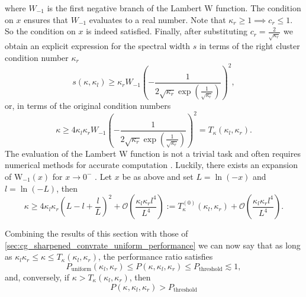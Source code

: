 where $W_{-1}$ is the first negative branch of the Lambert $\mathrm{W}$ function. The condition on $x$ ensures that $W_{-1}$ evaluates to a real number. Note that $\kappa_r\geq1 \implies c_r \leq 1$. So the condition on $x$ is indeed satisfied. Finally, after substituting $c_r = \frac{2}{\sqrt{\kappa_r}}$ we obtain an explicit expression for the spectral width $s$ in terms of the right cluster condition number $\kappa_r$
\[
    s(\kappa, \kappa_l) \geq \kappa_r W_{-1}\left(-\frac{1}{2\sqrt{\kappa_r}\exp\left(\frac{1}{\sqrt{\kappa_r}}\right)}\right)^2,
\]
or, in terms of the original condition numbers
\begin{equation}
    \kappa \geq 4\kappa_l\kappa_r W_{-1}\left(-\frac{1}{2\sqrt{\kappa_r}\exp\left(\frac{1}{\sqrt{\kappa_r}}\right)}\right)^2 = T_{\kappa}(\kappa_l, \kappa_r).
    \label{eq:threshold_inequality_explicit}
\end{equation}
The evaluation of the Lambert $\mathrm{W}$ function is not a trivial task and often requires numerical methods for accurate computation \cite{evaluation_of_the_lambert_w_function_Corless1996}. Luckily, there exists an expansion of $\mathrm{W}_{-1}(x)$ for $x\rightarrow0^-$ \cite[Equation 4.19]{evaluation_of_the_lambert_w_function_Corless1996}. Let $x$ be as above and set $L = \ln(-x)$ and $l = \ln(-L)$, then
\begin{equation}
    \kappa \geq 4\kappa_l\kappa_r \left(L - l + \frac{l}{L}\right)^2 + \mathcal{O}\left(\frac{\kappa_l\kappa_rl^4}{L^4}\right) := T^{(0)}_{\kappa}(\kappa_l, \kappa_r) + \mathcal{O}\left(\frac{\kappa_l\kappa_rl^4}{L^4}\right).
    \label{eq:threshold_inequality_explicit_expansion}
\end{equation}

Combining the results of this section with those of \cref{sec:cg_sharpened_convrate_uniform_performance} we can now say that as long as $\kappa_l\kappa_r \leq \kappa \leq T_{\kappa}(\kappa_l, \kappa_r)$, the performance ratio satisfies
\begin{equation}
    P_{\text{uniform}}(\kappa_l, \kappa_r) \leq P(\kappa, \kappa_l, \kappa_r) \leq P_{\text{threshold}} \lesssim 1,
    \label{eq:performance_bounds}
\end{equation}
and, conversely, if $\kappa > T_{\kappa}(\kappa_l, \kappa_r)$, then
\[
    P(\kappa, \kappa_l, \kappa_r) > P_{\text{threshold}}
\]

